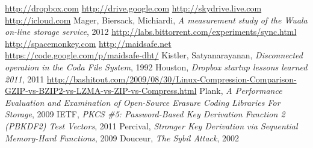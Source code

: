 \documentclass[11pt]{IEEEtran}
\begin{document}
\begin{thebibliography}{1}
 \url{http://dropbox.com}
 \url{http://drive.google.com}
 \url{http://skydrive.live.com}
 \url{http://icloud.com}
 Mager, Biersack, Michiardi, \emph{A measurement study of the {W}uala on-line storage service}, 2012
 \url{http://labs.bittorrent.com/experiments/sync.html}
 \url{http://spacemonkey.com}
 \url{http://maidsafe.net}
 \url{https://code.google.com/p/maidsafe-dht/}
  Kistler, Satyanarayanan, \emph{Disconnected operation in the Coda File System}, 1992
 Houston, \emph{Dropbox startup lessons learned 2011}, 2011
 \url{http://bashitout.com/2009/08/30/Linux-Compression-Comparison-GZIP-vs-BZIP2-vs-LZMA-vs-ZIP-vs-Compress.html}
 Plank, \emph{A Performance Evaluation and Examination of Open-Source Erasure Coding Libraries For Storage}, 2009
 IETF, \emph{PKCS \#5: Password-Based Key Derivation Function 2 (PBKDF2) Test Vectors}, 2011
 Percival, \emph{Stronger Key Derivation via Sequential Memory-Hard Functions}, 2009
 Douceur, \emph{The Sybil Attack}, 2002
\end{thebibliography}


\end{document}
